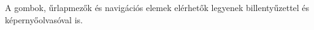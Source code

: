 A gombok, űrlapmezők és navigációs elemek elérhetők legyenek billentyűzettel és képernyőolvasóval is.
